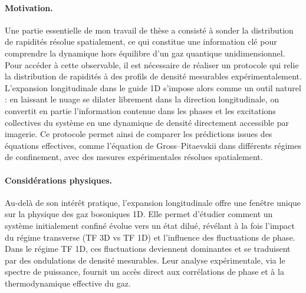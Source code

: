 \paragraph{Motivation.}
Une partie essentielle de mon travail de thèse a consisté à sonder la distribution de rapidités résolue spatialement, ce qui constitue une information clé pour comprendre la dynamique hors équilibre d’un gaz quantique unidimensionnel. Pour accéder à cette observable, il est nécessaire de réaliser un protocole qui relie la distribution de rapidités à des profils de densité mesurables expérimentalement. L’expansion longitudinale dans le guide 1D s’impose alors comme un outil naturel : en laissant le nuage se dilater librement dans la direction longitudinale, on convertit en partie l’information contenue dans les phases et les excitations collectives du système en une dynamique de densité directement accessible par imagerie. Ce protocole permet ainsi de comparer les prédictions issues des équations effectives, comme l’équation de Gross–Pitaevskii dans différents régimes de confinement, avec des mesures expérimentales résolues spatialement.

\paragraph{Considérations physiques.}
Au-delà de son intérêt pratique, l’expansion longitudinale offre une fenêtre unique sur la physique des gaz bosoniques 1D. Elle permet d’étudier comment un système initialement confiné évolue vers un état dilué, révélant à la fois l’impact du régime transverse (TF 3D vs TF 1D) et l’influence des fluctuations de phase. Dans le régime TF 1D, ces fluctuations deviennent dominantes et se traduisent par des ondulations de densité mesurables. Leur analyse expérimentale, via le spectre de puissance, fournit un accès direct aux corrélations de phase et à la thermodynamique effective du gaz.

